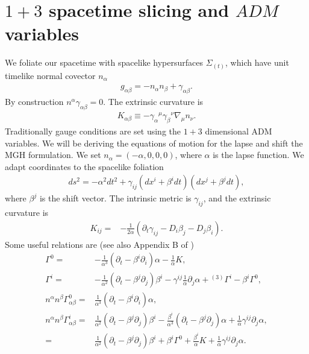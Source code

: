 \documentclass[%
notitlepage,
report,
nofootinbib,
 amsmath,amssymb,
 aps,
]{revtex4-1}
\begin{document}
\section{$1+3$ spacetime slicing and $ADM$ variables}
\label{sec:eom_lapse_shift}
   We foliate our spacetime with spacelike hypersurfaces
$\Sigma_{(t)}$, which have unit timelike normal covector $n_{\alpha}$
\begin{align}
   g_{\alpha\beta}
   =
-  n_{\alpha}n_{\beta}
+  \gamma_{\alpha\beta}
   .
\end{align}
   By construction $n^{\alpha}\gamma_{\alpha\beta}=0$.
The extrinsic curvature is 
\begin{align}
   K_{\alpha\beta}
   \equiv
-  \gamma_{\alpha}{}^{\mu}
   \gamma_{\beta}{}^{\nu}
   \nabla_{\mu}n_{\nu}
   .
\end{align}
   Traditionally gauge conditions are set using the $1+3$ dimensional ADM
variables. We will be deriving the equations of motion for the lapse and
shift the MGH formulation. 
We set $n_{\alpha}=\left(-\alpha,0,0,0\right)$, where
$\alpha$ is the lapse function.
We adapt coordinates to the spacelike foliation
\begin{align}
   ds^2
   =
-  \alpha^2dt^2
+  \gamma_{ij}\left(dx^i+\beta^idt\right)\left(dx^j+\beta^jdt\right)
   ,
\end{align}
   where $\beta^j$ is the shift vector.
The intrinsic metric is $\gamma_{ij}$, and the extrinsic curvature is
\begin{align}
   K_{ij}
   =&
-  \frac{1}{2\alpha}\left(
      \partial_t\gamma_{ij}
   -  D_i\beta_j
   -  D_j\beta_i
   \right) 
   .
\end{align}
   Some useful relations are
(see also Appendix B of \cite{alcubierre2008introduction})
\begin{subequations}
\begin{align}
   \Gamma^0
   =&
-  \frac{1}{\alpha^3}\left(
      \partial_t
   -  \beta^i\partial_i
   \right)
   \alpha
-  \frac{1}{\alpha}K
   ,\\
   \Gamma^i
   =&
-  \frac{1}{\alpha^2}\left(
      \partial_t
   -  \beta^j\partial_j
   \right)
   \beta^i
-  \gamma^{ij}\frac{1}{\alpha}\partial_j\alpha
+  {}^{(3)}\Gamma^i
-  \beta^i\Gamma^0
   ,\\
   n^{\alpha}n^{\beta}\Gamma^0_{\alpha\beta}
   =&
   \frac{1}{\alpha^3}\left(
      \partial_t
   -  \beta^i\partial_i
   \right)
   \alpha
   ,\\
   n^{\alpha}n^{\beta}\Gamma^i_{\alpha\beta}
   =&
   \frac{1}{\alpha^2}\left(
      \partial_t
   -  \beta^j\partial_j
   \right)\beta^i
-  \frac{\beta^i}{\alpha^3}
   \left(
      \partial_t
   -  \beta^j\partial_j
   \right)
   \alpha
+  \frac{1}{\alpha}\gamma^{ij}\partial_j\alpha
   ,\nonumber\\
   =&
   \frac{1}{\alpha^2}\left(
      \partial_t
   -  \beta^j\partial_j
   \right)\beta^i
+  \beta^i\Gamma^0
+  \frac{\beta^i}{\alpha}K
+  \frac{1}{\alpha}\gamma^{ij}\partial_j\alpha
   .
\end{align}
\end{subequations}
\end{document}
